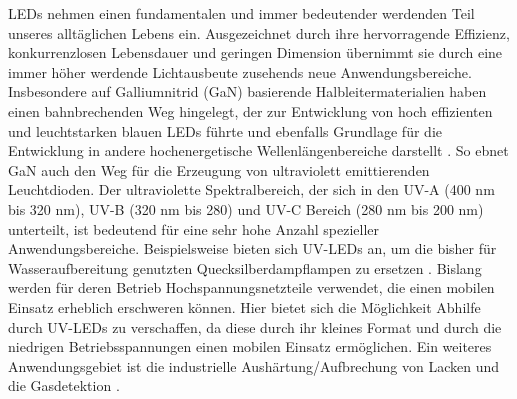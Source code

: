 LEDs nehmen einen fundamentalen und immer bedeutender werdenden Teil unseres alltäglichen Lebens ein. Ausgezeichnet durch ihre hervorragende Effizienz, konkurrenzlosen Lebensdauer und geringen Dimension übernimmt sie durch eine immer höher werdende Lichtausbeute zusehends neue Anwendungsbereiche.
\newline
Insbesondere auf Galliumnitrid (GaN) basierende Halbleitermaterialien haben einen bahnbrechenden Weg hingelegt, der zur Entwicklung von hoch effizienten und leuchtstarken blauen LEDs führte und ebenfalls Grundlage für die Entwicklung in andere hochenergetische Wellenlängenbereiche darstellt \cite{risk} \cite{Shuji1999CandelaclassHI} \cite{10007979421}. So ebnet GaN auch den Weg für die Erzeugung von ultraviolett emittierenden Leuchtdioden. Der ultraviolette Spektralbereich, der sich in den UV-A (400 nm bis 320 nm), UV-B (320 nm bis 280) und UV-C Bereich (280 nm bis 200 nm) unterteilt, ist bedeutend für eine sehr hohe Anzahl spezieller Anwendungsbereiche. 
\newline
Beispielsweise bieten sich UV-LEDs an, um die bisher für Wasseraufbereitung genutzten Quecksilberdampflampen zu ersetzen \cite{Vilhunen2009} \cite{WURTELE20111481}. Bislang werden für deren Betrieb Hochspannungsnetzteile verwendet, die einen mobilen Einsatz erheblich erschweren können. Hier bietet sich die Möglichkeit Abhilfe durch UV-LEDs zu verschaffen, da diese durch ihr kleines Format und durch die niedrigen Betriebsspannungen einen mobilen Einsatz ermöglichen. Ein weiteres Anwendungsgebiet ist die industrielle Aushärtung/Aufbrechung von Lacken und die Gasdetektion \cite{0268-1242-26-1-014036}\cite{LALINSKY2010152}. 
\iffalse
